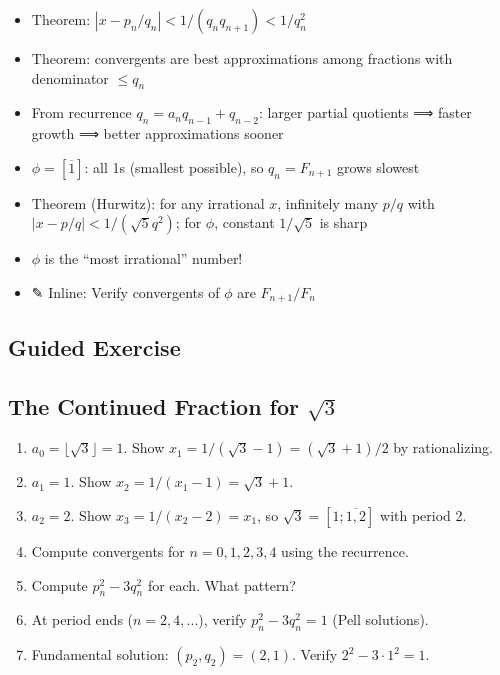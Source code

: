 \documentclass[
  10pt,
  letterpaper,
]{scrbook}
\providecommand{\tightlist}{%
  \setlength{\itemsep}{0pt}\setlength{\parskip}{0pt}}
\begin{document}
\begin{itemize}
\tightlist
\item
  Theorem: \(|x - p_n/q_n| < 1/(q_n q_{n+1}) < 1/q_n^2\)
\item
  Theorem: convergents are best approximations among fractions with
  denominator \(\leq q_n\)
\item
  From recurrence \(q_n = a_n q_{n-1} + q_{n-2}\): larger partial
  quotients ⟹ faster growth ⟹ better approximations sooner
\item
  \(\phi = [\overline{1}]\): all 1s (smallest possible), so
  \(q_n = F_{n+1}\) grows slowest
\item
  Theorem (Hurwitz): for any irrational \(x\), infinitely many \(p/q\)
  with \(|x - p/q| < 1/(\sqrt{5}q^2)\); for \(\phi\), constant
  \(1/\sqrt{5}\) is sharp
\item
  \(\phi\) is the ``most irrational'' number!
\item
  ✎ Inline: Verify convergents of \(\phi\) are \(F_{n+1}/F_n\)
\end{itemize}

\subsection{Guided Exercise}\label{guided-exercise-5}

\subsection{\texorpdfstring{The Continued Fraction for
\(\sqrt{3}\)}{The Continued Fraction for \textbackslash sqrt\{3\}}}\label{the-continued-fraction-for-sqrt3}

\begin{enumerate}
\def\labelenumi{(\alph{enumi})}
\item
  \(a_0 = \lfloor \sqrt{3} \rfloor = 1\). Show
  \(x_1 = 1/(\sqrt{3} - 1) = (\sqrt{3} + 1)/2\) by rationalizing.
\item
  \(a_1 = 1\). Show \(x_2 = 1/(x_1 - 1) = \sqrt{3} + 1\).
\item
  \(a_2 = 2\). Show \(x_3 = 1/(x_2 - 2) = x_1\), so
  \(\sqrt{3} = [1; \overline{1, 2}]\) with period 2.
\item
  Compute convergents for \(n = 0, 1, 2, 3, 4\) using the recurrence.
\item
  Compute \(p_n^2 - 3q_n^2\) for each. What pattern?
\item
  At period ends (\(n = 2, 4, ...\)), verify \(p_n^2 - 3q_n^2 = 1\)
  (Pell solutions).
\item
  Fundamental solution: \((p_2, q_2) = (2, 1)\). Verify
  \(2^2 - 3 \cdot 1^2 = 1\).
\end{enumerate}
\end{document}
